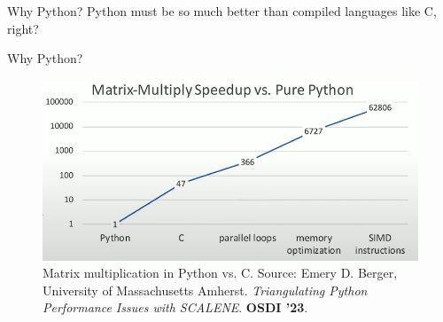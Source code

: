 \documentclass[aspectratio=169]{beamer}
\begin{document}
    \begin{frame}{Why Python?}
        \centering
        \Huge Python must be so much better than compiled languages like C, right?
    \end{frame}

    \begin{frame}{Why Python?}
        \begin{figure}[H]
            \centering
            \includegraphics[width=0.75\linewidth]{matrixmul.png}
            \caption{Matrix multiplication in Python vs. C. Source: Emery D. Berger, University of Massachusetts Amherst. \textit{Triangulating Python Performance Issues with SCALENE}. \textbf{OSDI '23}.}
        \end{figure}
    \end{frame}
\end{document}
